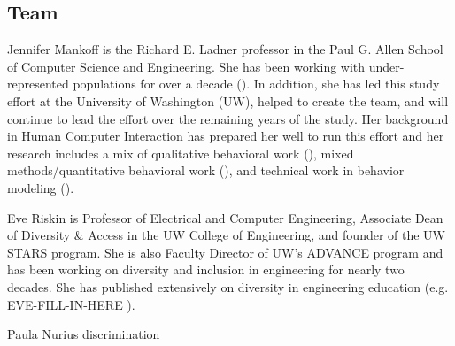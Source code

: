 \subsection{Team}
 
Jennifer Mankoff is the Richard E. Ladner professor in the Paul G. Allen School of Computer Science and Engineering. She has been working with under-represented populations for over a decade (\eg \cite{newman2004perceptions,DBLP:conf/huc/DillahuntMPF09,DBLP:conf/cscw/DillahuntM14,DBLP:conf/huc/DillahuntMP10,DBLP:journals/pacmhci/EarlyHHRWM18,DBLP:conf/chi/OLearyZMR19}). In addition, she has led this study effort at the University of Washington (UW), helped to create the team, and will continue to lead the effort over the remaining years of the study. Her background in Human Computer Interaction has prepared her well to run this effort and her research includes a mix of qualitative behavioral work (\eg \cite{DBLP:conf/huc/DillahuntMPF09,DBLP:conf/chi/MankoffKKRW11}), mixed methods/quantitative behavioral work (\eg \cite{DBLP:conf/ph/CrawfordGSAM14,DBLP:journals/pacmhci/EarlyHHRWM18}), and technical work in behavior modeling (\eg \cite{DBLP:conf/chi/BanovicBCMD16}). 
 
Eve Riskin is Professor of Electrical and Computer Engineering, Associate Dean of Diversity \& Access in the UW College of Engineering, and founder of the UW STARS program.  She is also Faculty Director of UW's ADVANCE program and has been working on diversity and inclusion in engineering for nearly two decades.  She  has published extensively on diversity in engineering education (e.g. EVE-FILL-IN-HERE ).
 
Paula Nurius discrimination

